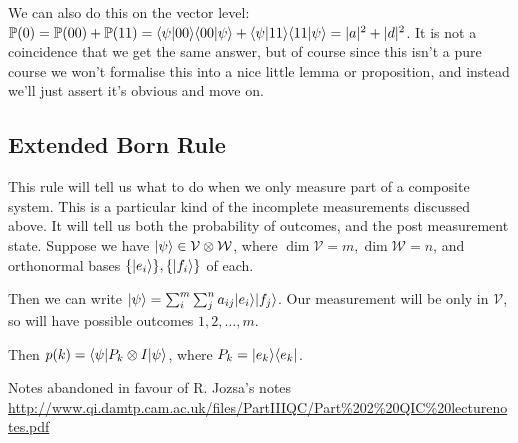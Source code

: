\documentclass[10pt,a4paper]{article}
\begin{document}
We can also do this on the vector level: $\mathbb{P}(0) = \mathbb{P}(00) + \mathbb{P}(11) = \langle \psi | 00 \rangle\langle 00 | \psi \rangle + \langle \psi | 11 \rangle\langle 11 | \psi \rangle = |a|^2+|d|^2$. It is not a coincidence that we get the same answer, but of course since this isn't a pure course we won't formalise this into a nice little lemma or proposition, and instead we'll just assert it's obvious and move on.

\subsection{Extended Born Rule}
This rule will tell us what to do when we only measure part of a composite system. This is a particular kind of the incomplete measurements discussed above. It will tell us both the probability of outcomes, and the post measurement state. Suppose we have $|\psi\rangle \in \mathcal{V} \otimes \mathcal{W}$, where $\dim\mathcal{V} = m, \dim\mathcal{W} = n$, and orthonormal bases $\{|e_i\rangle\}, \{|f_i\rangle\}$ of each.

Then we can write $|\psi\rangle = \sum_i^m \sum_j^n a_{ij}|e_i\rangle|f_j\rangle$. Our measurement will be only in $\mathcal{V}$, so will have possible outcomes $1, 2, \ldots, m$.

Then $p(k) = \langle \psi|P_k \otimes I |\psi\rangle$, where $P_k = |e_k\rangle\langle e_k|$.

Notes abandoned in favour of R. Jozsa's notes\\\href{http://www.qi.damtp.cam.ac.uk/files/PartIIIQC/Part\%202\%20QIC\%20lecturenotes.pdf}{http://www.qi.damtp.cam.ac.uk/files/PartIIIQC/Part\%202\%20QIC\%20lecturenotes.pdf}
\end{document}
